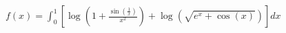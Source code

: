 \documentclass[preview]{standalone}
\begin{document}
\begin{center}
\(f(x) = \int_{0}^{1} \left[ \log\left( 1 + \frac{\sin\left( \frac{1}{x} \right)}{x^2} \right) + \log\left( \sqrt{e^x + \cos(x)} \right) \right] dx\)
\end{center}
\end{document}
